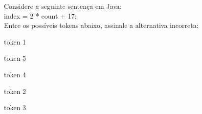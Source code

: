 \question[10]

Considere a seguinte sentença em Java:\\
index = 2 * count + 17;\\
Entre os possíveis tokens abaixo, assinale a alternativa incorreta:\\
\begin{choices}
\item token 1 
\item token 5 %
\item token 4
\item token 2
\item token 3 
\end{choices}
\answerline

